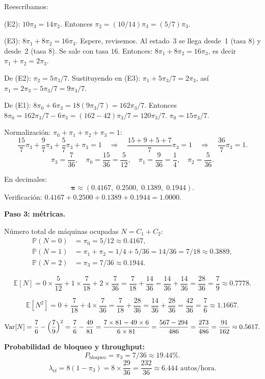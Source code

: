 \documentclass[11pt,a4paper]{article}
\theoremstyle{definition}
\theoremstyle{remark}
\newcommand{\E}{\mathbb{E}}
\newcommand{\Var}{\mathrm{Var}}
\newcommand{\Prob}{\mathbb{P}}
\begin{document}
\begin{ejemplo}
Reescribamos:

(E2): $10\pi_3 = 14\pi_2$.  Entonces $\pi_2 = (10/14)\pi_3 = (5/7)\pi_3$.

(E3): $8\pi_1 + 8\pi_2 = 16\pi_3$.  Espere, revisemos.  Al estado~3
se llega desde~1 (tasa $8$) y desde~2 (tasa $8$).  Se sale con tasa
$16$.  Entonces: $8\pi_1+8\pi_2 = 16\pi_3$, es decir
$\pi_1+\pi_2 = 2\pi_3$.

De (E2): $\pi_2 = 5\pi_3/7$.  Sustituyendo en (E3):
$\pi_1 + 5\pi_3/7 = 2\pi_3$, así $\pi_1 = 2\pi_3-5\pi_3/7 = 9\pi_3/7$.

De (E1): $8\pi_0+6\pi_3 = 18(9\pi_3/7) = 162\pi_3/7$.
Entonces $8\pi_0 = 162\pi_3/7 - 6\pi_3 = (162-42)\pi_3/7 = 120\pi_3/7$.
$\pi_0 = 15\pi_3/7$.

Normalización: $\pi_0+\pi_1+\pi_2+\pi_3 = 1$:
\[
  \frac{15}{7}\pi_3 + \frac{9}{7}\pi_3+\frac{5}{7}\pi_3+\pi_3 = 1
  \quad\Longrightarrow\quad
  \frac{15+9+5+7}{7}\pi_3 = 1
  \quad\Longrightarrow\quad
  \frac{36}{7}\pi_3 = 1.
\]
\[
  \pi_3 = \frac{7}{36}, \quad
  \pi_0 = \frac{15}{36} = \frac{5}{12}, \quad
  \pi_1 = \frac{9}{36} = \frac{1}{4}, \quad
  \pi_2 = \frac{5}{36}.
\]

En decimales:
\[
  \boldsymbol{\pi} \approx (0.4167,\;0.2500,\;0.1389,\;0.1944).
\]
Verificación: $0.4167+0.2500+0.1389+0.1944=1.0000$. \checkmark

\textbf{Paso 3: métricas.}

Número total de máquinas ocupadas $N=C_1+C_2$:
\begin{align*}
  \Prob(N=0) &= \pi_0 = 5/12 \approx 0.4167, \\
  \Prob(N=1) &= \pi_1+\pi_2 = 1/4+5/36 = 14/36 = 7/18 \approx 0.3889, \\
  \Prob(N=2) &= \pi_3 = 7/36 \approx 0.1944.
\end{align*}

\[
  \E[N] = 0\times\frac{5}{12} + 1\times\frac{7}{18} + 2\times\frac{7}{36}
  = \frac{7}{18}+\frac{14}{36} = \frac{14}{36}+\frac{14}{36}
  = \frac{28}{36} = \frac{7}{9} \approx 0.7778.
\]

\[
  \E[N^2] = 0+\frac{7}{18}+4\times\frac{7}{36}
  = \frac{7}{18}+\frac{28}{36} = \frac{14}{36}+\frac{28}{36}
  = \frac{42}{36} = \frac{7}{6} \approx 1.1667.
\]

\[
  \Var[N] = \frac{7}{6}-\Bigl(\frac{7}{9}\Bigr)^2
  = \frac{7}{6}-\frac{49}{81}
  = \frac{7\times 81 - 49\times 6}{6\times 81}
  = \frac{567-294}{486} = \frac{273}{486} = \frac{91}{162}
  \approx 0.5617.
\]

\textbf{Probabilidad de bloqueo y throughput:}
\[
  P_{\text{bloqueo}} = \pi_3 = 7/36 \approx 19.44\%.
\]
\[
  \lambda_{\text{ef}} = 8(1-\pi_3) = 8\times\frac{29}{36}
  = \frac{232}{36} \approx 6.444 \text{ autos/hora}.
\]


\end{ejemplo}
\end{document}
